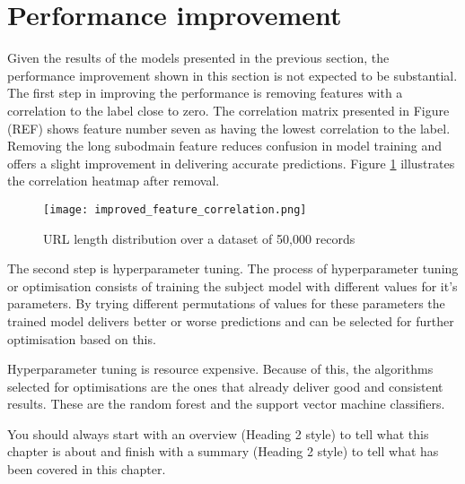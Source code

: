 \section{Performance improvement}
Given the results of the models presented in the previous section, the performance improvement shown in this section is not expected to be substantial.
The first step in improving the performance is removing features with a correlation to the label close to zero. The correlation matrix presented in Figure (REF) shows feature number seven as having the lowest correlation to the label. Removing the long subodmain feature reduces confusion in model training and offers a slight improvement in delivering accurate predictions. Figure \ref{fig:IMPROVED_FEATURE_CORRELATION} illustrates the correlation heatmap after removal.

\begin{figure}[t]
	\centering
	\texttt{[image: improved\_feature\_correlation.png]}
	\caption{URL length distribution over a dataset of 50,000 records}
	\label{fig:IMPROVED_FEATURE_CORRELATION}
\end{figure}

The second step is hyperparameter tuning. The process of hyperparameter tuning or optimisation consists of training the subject model with different values for it's parameters. By trying different permutations of values for these parameters the trained model delivers better or worse predictions and can be selected for further optimisation based on this.

Hyperparameter tuning is resource expensive. Because of this, the algorithms selected for optimisations are the ones that already deliver good and consistent results. These are the random forest and the support vector machine classifiers.


















\iffalse
	You should always start with an overview (Heading 2 style) to tell what this chapter is about and finish with a summary (Heading 2 style) to tell what has been covered in this chapter.

